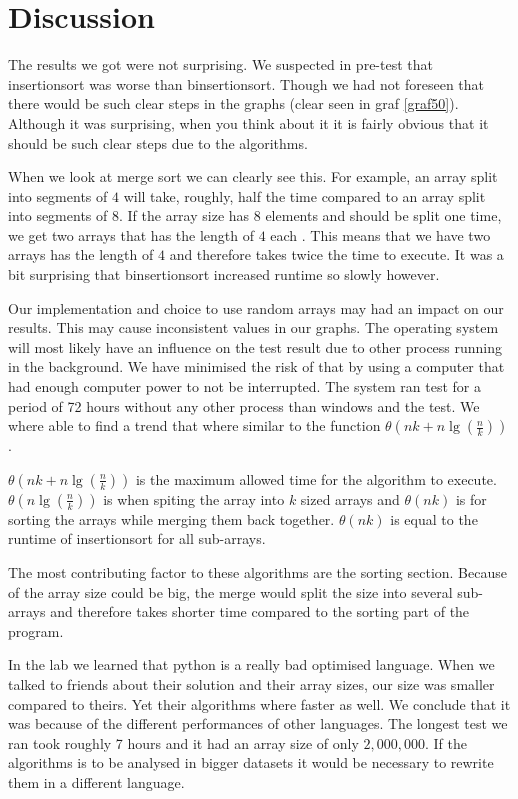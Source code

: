\documentclass[paper=a4, fontsize=11pt]{scrartcl}
\numberwithin{equation}{section}		%
\numberwithin{figure}{section}			%
\numberwithin{table}{section}				%
\begin{document}
\section{Discussion}
The results we got were not surprising. We suspected in pre-test that insertionsort was worse than binsertionsort. Though we had not foreseen that there would be such clear steps in the graphs (clear seen in graf \ref{graf50}). Although it was surprising, when you think about it it is fairly obvious that it should be such clear steps due to the algorithms. 

When we look at merge sort we can clearly see this. For example, an array split into segments of $4$ will take, roughly, half the time compared to an array split into segments of $8$. If the array size has $8$ elements and should be split one time, we get two arrays that has the length of $4$ each . This means that we have two arrays has the length of $4$ and therefore takes twice the time to execute. It was a bit surprising that binsertionsort increased runtime so slowly however.

Our implementation and choice to use random arrays may had an impact on our results. This may cause inconsistent values in our graphs. The operating system will most likely have an influence on the test result due to other process running in the background. We have minimised the risk of that by using a computer that had enough computer power to not be interrupted. The system ran test for a period of 72 hours without any other process than windows and the test. We where able to find a trend that where similar to the function $\theta(nk + n\lg(\frac{n}{k}))$.

$\theta(nk + n\lg(\frac{n}{k}))$ is the maximum allowed time for the algorithm to execute. $\theta(n\lg(\frac{n}{k}))$ is when spiting the array into $k$ sized arrays and $\theta(nk)$ is for sorting the arrays while merging them back together. $\theta(nk)$ is equal to the runtime of insertionsort for all sub-arrays.

The most contributing factor to these algorithms are the sorting section. Because of the array size could be big, the merge would split the size into several sub-arrays and therefore takes shorter time compared to the sorting part of the program.

In the lab we learned that python is a really bad optimised language. When we talked to friends about their solution and their array sizes, our size was smaller compared to theirs. Yet their algorithms where faster as well. We conclude that it was because of the different performances of other languages. The longest test we ran took roughly 7 hours and it had an array size of only $2,000,000$. If the algorithms is to be analysed in bigger datasets it would be necessary to rewrite them in a different language.


\end{document}
